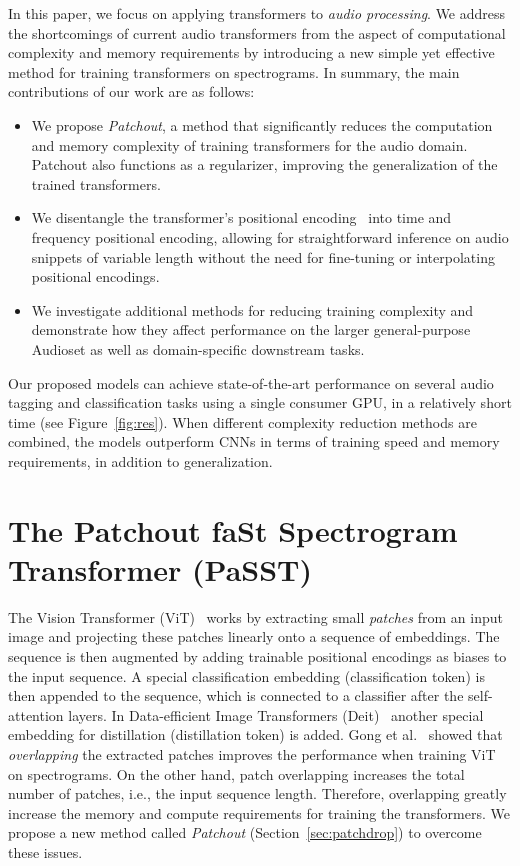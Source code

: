 \documentclass[a4paper]{article}
\begin{document}
In this paper, we focus on applying transformers to \emph{audio processing}. We address the shortcomings of current audio transformers from the aspect of computational complexity and memory requirements by introducing a new simple yet effective method for training transformers on spectrograms.
In summary, the main contributions of our work are as follows:
\begin{itemize}
    \item  We propose \emph{Patchout}, a method that significantly reduces the computation and memory complexity of training transformers for the audio domain. Patchout also functions as a regularizer, improving the generalization of the trained transformers.
    \item We disentangle the transformer's positional encoding~\cite{dosovitskiyB0WZ21VIT,TouvronCDMSJ21deit,gong21ast} into time and frequency positional encoding, allowing for straightforward inference on audio snippets of variable length without the need for fine-tuning or interpolating positional encodings.
    \item We investigate additional methods for reducing training complexity and demonstrate how they affect performance on the larger general-purpose Audioset as well as domain-specific downstream tasks.
\end{itemize}
Our proposed models can achieve state-of-the-art performance on several audio tagging and classification tasks using a single consumer GPU, in a relatively short time (see Figure~\ref{fig:res}). When different complexity reduction methods are combined, the models outperform CNNs in terms of training speed and memory requirements, in addition to generalization.


\section{The Patchout faSt Spectrogram  Transformer {(P\MakeLowercase{a}SST)}}
\label{sec:arch}

The Vision Transformer (ViT)~\cite{dosovitskiyB0WZ21VIT} works by extracting small \emph{patches} from an input image and projecting these patches linearly onto a sequence of embeddings. The sequence is then augmented by adding trainable positional encodings as biases to the input sequence. A special classification embedding (classification token) is then appended to the sequence, which is connected to a classifier after the self-attention layers. In  Data-efficient Image Transformers (Deit)~\cite{TouvronCDMSJ21deit} another special embedding for distillation  (distillation token) is added. 
Gong et al.~\cite{gong21ast} showed that \emph{overlapping} the extracted patches improves the performance when training ViT on spectrograms. On the other hand, patch overlapping increases the total number of patches, i.e., the input sequence length. Therefore, overlapping greatly increase the memory and compute requirements for training the transformers. We propose a new method called \emph{Patchout} (Section~\ref{sec:patchdrop}) to overcome these issues. 
\end{document}

